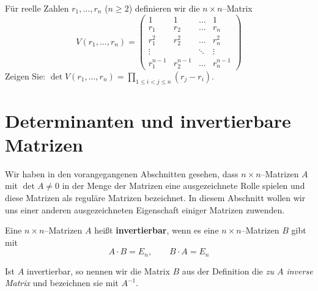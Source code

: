 \begin{aufgabe} Für reelle Zahlen $r_1, \ldots ,r_n$ ($n \geq 2$) definieren wir die $n \times n$--Matrix
  	$$ V(r_1, \ldots, r_n) = \left( \begin{matrix} 1 & 1 & \ldots & 1 \\r_1 & r_2 & \ldots & r_n \\
	r_1^2 & r_2^2 & \ldots & r_n^2 \\  \vdots & & \ddots & \vdots \\
	r_1^{n-1} & r_2^{n-1} & \ldots & r_n^{n-1} \end{matrix} \right) $$
Zeigen Sie: $\det{V(r_1, \ldots, r_n)} = \prod\limits_{1 \leq i < j \leq n} (r_j-r_i)$.
\end{aufgabe}


\bigbreak

\newpage

\section{Determinanten und invertierbare Matrizen}\label{section_det_inverse}

\setcounter{definition}{0}
\setcounter{beispiel}{0}
\setcounter{notiz}{0}

Wir haben in den vorangegangenen Abschnitten gesehen, dass $n \times n$--Matrizen $A$ mit $\det{A} \neq 0$ 
in der Menge der Matrizen eine ausgezeichnete Rolle spielen und diese Matrizen als reguläre Matrizen 
bezeichnet. In diesem Abschnitt wollen wir uns einer anderen ausgezeichneten Eigenschaft einiger Matrizen 
zuwenden.

\begin{definition} Eine $n \times n$--Matrizen $A$ heißt \textbf{invertierbar}, 
wenn es eine $n \times n$--Matrizen $B$ gibt mit
  	$$ A \cdot B = E_n, \qquad   B \cdot A = E_n $$
\end{definition}

 Ist $A$ invertierbar, so nennen wir die Matrix $B$ aus der Definition die \textit{zu $A$ 
inverse Matrix} und bezeichnen sie mit $A^{-1}$.

